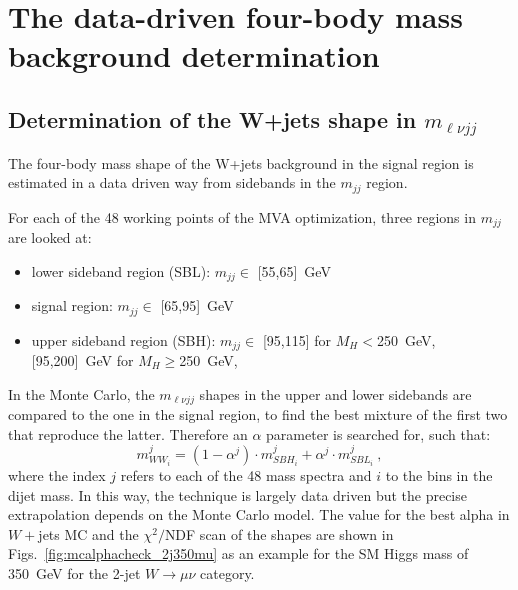 \section{The data-driven four-body mass background determination}
\label{sec:wjetsBackground}


\subsection{Determination of the W+jets shape in \texorpdfstring{$m_{\ell{}\nu{}jj}$}{Four-body Invariant Mass}}
\label{sec:alphaExtraction}

The four-body mass shape of the W+jets background in the signal region
is estimated in a data driven way from sidebands in the $m_{jj}$ region.

For each of the 48 working points of the MVA optimization,
three regions in $m_{jj}$ are looked at:
\begin{itemize}
\item lower sideband region (SBL):  $m_{jj} \in$ [55,65]~GeV
\item signal region: $m_{jj} \in $ [65,95]~GeV
\item upper sideband region (SBH): $m_{jj} \in$ [95,115] for $M_H<$250~GeV, [95,200]~GeV  for $M_H\ge$250~GeV, 
\end{itemize}

In the Monte Carlo,
the $m_{\ell\nu jj}$ shapes in the upper and lower sidebands
are compared to the one in the signal region,
to find the best mixture of the first two that reproduce the latter.
Therefore an $\alpha$ parameter is searched for, such that:
\begin{equation}
m_{WW_i}^{j} = (1-\alpha^j) \cdot m_{SBH_i}^j + \alpha^j \cdot  m_{SBL_i}^j~,
\label{EqnAlpha}
\end{equation}
where the index $j$ refers to each of the 48 mass spectra and $i$ to
the bins in the dijet mass.  In this way, the technique is largely
data driven but the precise extrapolation depends on the Monte Carlo
model. The value for the best alpha in $W+$jets MC and the $\chi^2/$NDF
scan of the shapes are shown in Figs.~\ref{fig:mcalphacheck_2j350mu}
as an example for the SM Higgs mass of 350~GeV for the 2-jet
$W\to\mu\nu$ category.

